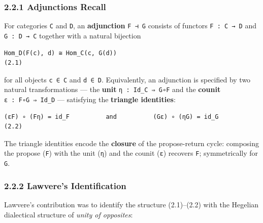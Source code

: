 \documentclass[
]{article}
\begin{document}
\hypertarget{adjunctions-recall}{%
\subsubsection{2.2.1 Adjunctions Recall}\label{adjunctions-recall}}

For categories \texttt{C} and \texttt{D}, an \textbf{adjunction}
\texttt{F\ ⊣\ G} consists of functors \texttt{F\ :\ C\ →\ D} and
\texttt{G\ :\ D\ →\ C} together with a natural bijection

\begin{verbatim}
Hom_D(F(c), d) ≅ Hom_C(c, G(d))                                       (2.1)
\end{verbatim}

for all objects \texttt{c\ ∈\ C} and \texttt{d\ ∈\ D}. Equivalently, an
adjunction is specified by two natural transformations --- the
\textbf{unit} \texttt{η\ :\ Id\_C\ ⇒\ G∘F} and the \textbf{counit}
\texttt{ε\ :\ F∘G\ ⇒\ Id\_D} --- satisfying the \textbf{triangle
identities}:

\begin{verbatim}
(εF) ∘ (Fη) = id_F          and          (Gε) ∘ (ηG) = id_G            (2.2)
\end{verbatim}

The triangle identities encode the \textbf{closure} of the
propose-return cycle: composing the propose (\texttt{F}) with the unit
(\texttt{η}) and the counit (\texttt{ε}) recovers \texttt{F};
symmetrically for \texttt{G}.

\hypertarget{lawveres-identification}{%
\subsubsection{2.2.2 Lawvere's
Identification}\label{lawveres-identification}}

Lawvere's contribution was to identify the structure (2.1)--(2.2) with
the Hegelian dialectical structure of \emph{unity of opposites}:
\end{document}
